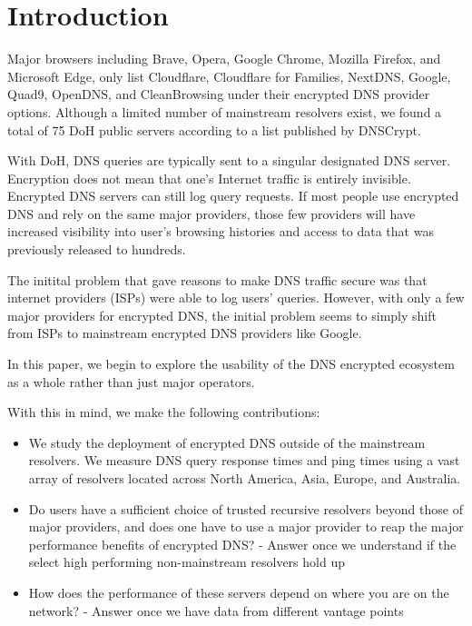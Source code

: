 \section{Introduction}\label{sec:intro}

Major browsers including Brave, Opera, Google Chrome, Mozilla Firefox, and Microsoft Edge, only list Cloudflare, Cloudflare for Families, NextDNS, Google, Quad9, OpenDNS, and CleanBrowsing under their encrypted DNS provider options.
Although a limited number of mainstream resolvers exist, we found a total of 75 DoH public servers according to a list published by DNSCrypt.

With DoH, DNS queries are typically sent to a singular designated DNS server.
Encryption does not mean that one's Internet traffic is entirely invisible. 
Encrypted DNS servers can still log query requests.   
If most people use encrypted DNS and rely on the same major providers, those few providers will have increased visibility into user's browsing histories and access to data that was previously released to hundreds. 

The initital problem that gave reasons to make DNS traffic secure was that internet providers (ISPs) were able to log users' queries. 
However, with only a few major providers for encrypted DNS, the initial problem seems to simply shift from ISPs to mainstream encrypted DNS providers like Google. 

In this paper, we begin to explore the usability of the DNS encrypted ecosystem as a whole rather than just major operators. 

With this in mind, we make the following contributions:

\begin{itemize}
\setlength\itemsep{0em}
\item We study the deployment of encrypted DNS outside of the mainstream resolvers. We measure DNS query response times and ping times using a vast array of resolvers located across North America, Asia, Europe, and Australia. 
\item Do users have a sufficient choice of trusted recursive resolvers beyond those of major providers, and does one have to use a major provider to reap the major performance benefits of encrypted DNS?
	- Answer once we understand if the select high performing non-mainstream resolvers hold up 
\item How does the performance of these servers depend on where you are on the network?
	- Answer once we have data from different vantage points 

\end{itemize}

